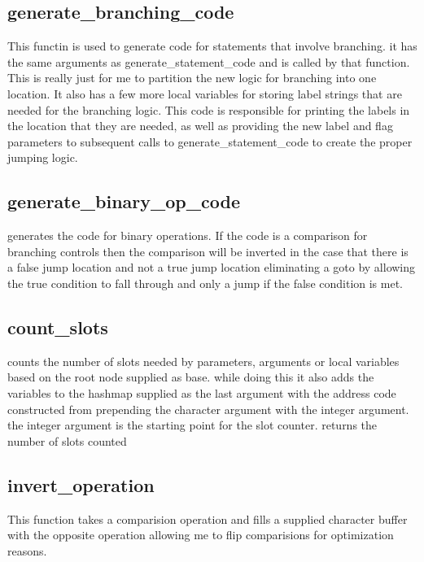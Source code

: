 \documentclass[11pt]{article}
\begin{document}
        \subsection{generate\_branching\_code}
            This functin is used to generate code for statements that involve branching.
            it has the same arguments as generate\_statement\_code and is called by
            that function. This is really just for me to partition the new logic for branching into
            one location. It also has a few more local variables for storing label strings that
            are needed for the branching logic. This code is responsible for printing the labels
            in the location that they are needed, as well as providing the new label and flag 
            parameters to subsequent calls to generate\_statement\_code to create the proper jumping 
            logic.

        \subsection{generate\_binary\_op\_code}
            generates the code for binary operations. If the code is a comparison for branching controls
            then the comparison will be inverted in the case that there is a false jump location
            and not a true jump location eliminating a goto by allowing the true condition to fall
            through and only a jump if the false condition is met.

        \subsection{count\_slots}
            counts the number of slots needed by parameters, arguments or 
            local variables based on the root node supplied as base.
            while doing this it also adds the variables to the hashmap supplied
            as the last argument with the address code constructed from
            prepending the character argument with the integer argument.
            the integer argument is the starting point for the slot counter.
            returns the number of slots counted

        \subsection{invert\_operation}
            This function takes a comparision operation and fills a supplied character 
            buffer with the opposite operation allowing me to flip comparisions
            for optimization reasons.
\end{document}
